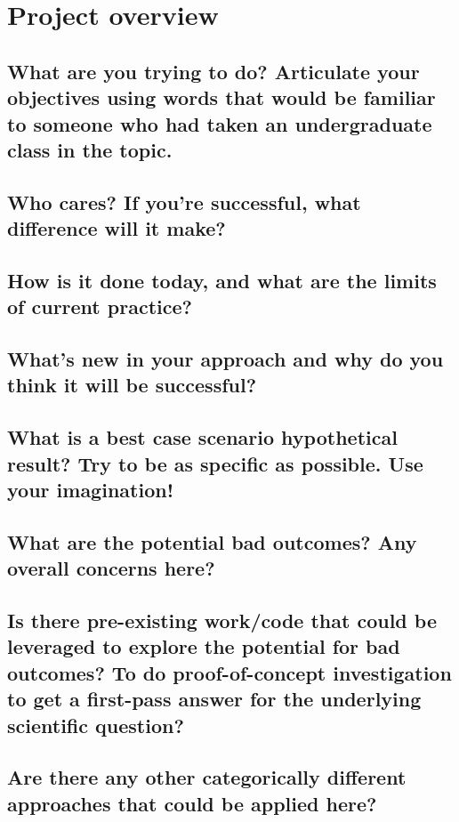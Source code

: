 \section{Project overview}

\subsection{What are you trying to do? Articulate your objectives using words that would be familiar to someone who had taken an undergraduate class in the topic.}

\subsection{Who cares? If you're successful, what difference will it make?}

\subsection{How is it done today, and what are the limits of current practice?}

\subsection{What's new in your approach and why do you think it will be successful?}

\subsection{What is a best case scenario hypothetical result? Try to be as specific as possible. Use your imagination!}

\subsection{What are the potential bad outcomes? Any overall concerns here?}

\subsection{Is there pre-existing work/code that could be leveraged to explore the potential for bad outcomes? To do proof-of-concept investigation to get a first-pass answer for the underlying scientific question?}

\subsection{Are there any other categorically different approaches that could be applied here?}

